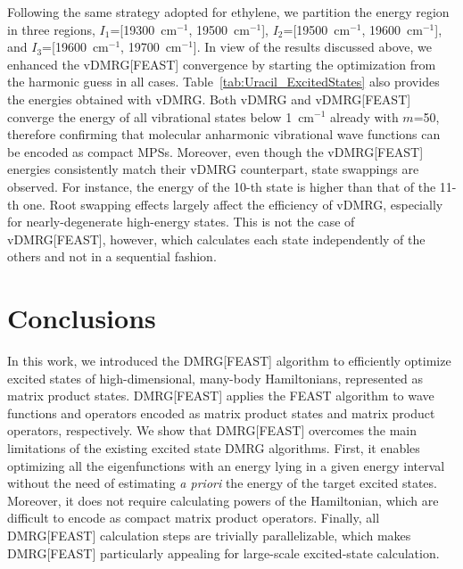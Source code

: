 \documentclass[journal=jctcce]{achemso}
\begin{document}
\noindent Following the same strategy adopted for ethylene, we partition the energy region in three regions, $I_1$=[19300~cm$^{-1}$, 19500~cm$^{-1}$], $I_2$=[19500~cm$^{-1}$, 19600~cm$^{-1}$], and $I_3$=[19600~cm$^{-1}$, 19700~cm$^{-1}$].
In view of the results discussed above, we enhanced the vDMRG[FEAST] convergence by starting the optimization from the harmonic guess in all cases.
Table~\ref{tab:Uracil_ExcitedStates} also provides the energies obtained with vDMRG.
Both vDMRG and vDMRG[FEAST] converge the energy of all vibrational states below 1~cm$^{-1}$ already with $m$=50, therefore confirming that molecular anharmonic vibrational wave functions can be encoded as compact MPSs.
Moreover, even though the vDMRG[FEAST] energies consistently match their vDMRG counterpart, state swappings are observed.
For instance, the energy of the 10-th state is higher than that of the 11-th one.
Root swapping effects largely affect the efficiency of vDMRG, especially for nearly-degenerate high-energy states.
This is not the case of vDMRG[FEAST], however, which calculates each state independently of the others and not in a sequential fashion.


\section{Conclusions}
\label{sec:conclusions}
In this work, we introduced the DMRG[FEAST] algorithm to efficiently optimize excited states of high-dimensional, many-body Hamiltonians, represented as matrix product states.
DMRG[FEAST] applies the FEAST algorithm\cite{Polizzi2009_FEAST} to wave functions and operators encoded as matrix product states and matrix product operators, respectively.\cite{McCulloch2007_FromMPStoDMRG}
We show that DMRG[FEAST] overcomes the main limitations of the existing excited state DMRG algorithms.\cite{Dorando2007_TargetingExcitedStates,Keller2015_MPS-MPO-SQHamiltonian,Devakul2017,Yu2017_ShiftAndInvertMPS,Baiardi2019_HighEnergy-vDMRG}
First, it enables optimizing all the eigenfunctions with an energy lying in a given energy interval without the need of estimating \textit{a priori} the energy of the target excited states.
Moreover, it does not require calculating powers of the Hamiltonian, which are difficult to encode as compact matrix product operators.\cite{Cangiani2013_Folded,Baiardi2019_HighEnergy-vDMRG}
Finally, all DMRG[FEAST] calculation steps are trivially parallelizable, which makes DMRG[FEAST] particularly appealing for large-scale excited-state calculation.
\end{document}
